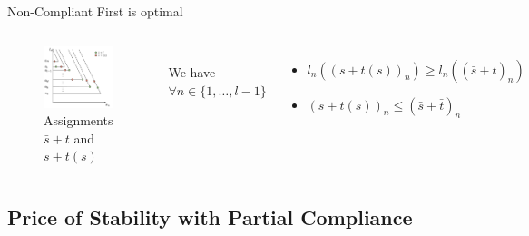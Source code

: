 \documentclass[xcolor=svgnames, english, smaller]{beamer}
\theoremstyle{plain}
\theoremstyle{definition}
\theoremstyle{plain}
\theoremstyle{plain}
\begin{document}
\begin{frame}{Non-Compliant First is optimal}

\begin{columns}[t]



\begin{figure}
\centering
\includegraphics[scale=0.25]{../../figures/presentation/optimal_stackelberg_proof4.png}
\caption{Assignments $\bar{s}+\bar{t}$ and $s+t(s)$}
\end{figure}


\\[.7in]
We have $\forall n \in \{1, \dots, l-1\}$

\begin{itemize}
\item $l_n((s+t(s))_n) \geq l_n((\bar{s}+\bar{t})_n)$
\item $(s+t(s))_n \leq (\bar{s}+\bar{t})_n$
\end{itemize}

\end{columns}

\end{frame}

\subsection{Price of Stability with Partial Compliance}
\end{document}
